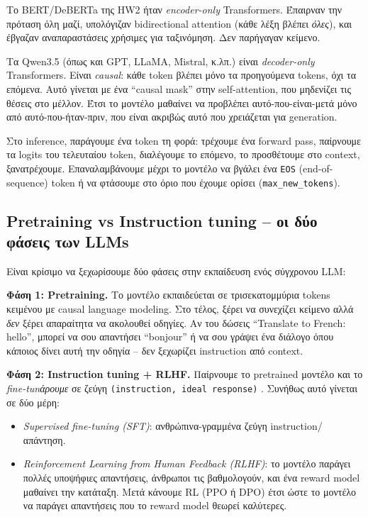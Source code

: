 \documentclass[12pt]{fphw}
\begin{document}
Το BERT/DeBERTa της HW2 ήταν \emph{encoder-only} Transformers. Έπαιρναν την πρόταση όλη μαζί, υπολόγιζαν bidirectional attention (κάθε λέξη βλέπει \emph{όλες}), και έβγαζαν αναπαραστάσεις χρήσιμες για ταξινόμηση. Δεν παρήγαγαν κείμενο.

Τα Qwen3.5 (όπως και GPT, LLaMA, Mistral, κ.λπ.) είναι \emph{decoder-only} Transformers. Είναι \emph{causal}: κάθε token βλέπει μόνο τα προηγούμενα tokens, όχι τα επόμενα. Αυτό γίνεται με ένα ``causal mask'' στην self-attention, που μηδενίζει τις θέσεις στο μέλλον. Έτσι το μοντέλο μαθαίνει να προβλέπει αυτό-που-είναι-μετά μόνο από αυτό-που-ήταν-πριν, που είναι ακριβώς αυτό που χρειάζεται για generation.

Στο inference, παράγουμε ένα token τη φορά: τρέχουμε ένα forward pass, παίρνουμε τα logits του τελευταίου token, διαλέγουμε το επόμενο, το προσθέτουμε στο context, ξανατρέχουμε. Επαναλαμβάνουμε μέχρι το μοντέλο να βγάλει ένα \texttt{EOS} (end-of-sequence) token ή να φτάσουμε στο όριο που έχουμε ορίσει (\texttt{max\_new\_tokens}).

\subsection{Pretraining vs Instruction tuning -- οι δύο φάσεις των LLMs}

Είναι κρίσιμο να ξεχωρίσουμε δύο φάσεις στην εκπαίδευση ενός σύγχρονου LLM:

\textbf{Φάση 1: Pretraining.} Το μοντέλο εκπαιδεύεται σε τρισεκατομμύρια tokens κειμένου με causal language modeling. Στο τέλος, ξέρει να συνεχίζει κείμενο αλλά \emph{δεν} ξέρει απαραίτητα να ακολουθεί οδηγίες. Αν του δώσεις ``Translate to French: hello'', μπορεί να σου απαντήσει ``bonjour'' ή να σου γράψει ένα διάλογο όπου κάποιος δίνει αυτή την οδηγία -- δεν ξεχωρίζει instruction από context.

\textbf{Φάση 2: Instruction tuning + RLHF.} Παίρνουμε το pretrained μοντέλο και το \emph{fine-tunάρουμε} σε ζεύγη \texttt{(instruction, ideal response)} \cite{wei2022instructiontuned,ouyang2022instructgpt}. Συνήθως αυτό γίνεται σε δύο μέρη:

\begin{itemize}
    \item \emph{Supervised fine-tuning (SFT)}: ανθρώπινα-γραμμένα ζεύγη instruction/απάντηση.
    \item \emph{Reinforcement Learning from Human Feedback (RLHF)}: το μοντέλο παράγει πολλές υποψήφιες απαντήσεις, άνθρωποι τις βαθμολογούν, και ένα reward model μαθαίνει την κατάταξη. Μετά κάνουμε RL (PPO ή DPO) έτσι ώστε το μοντέλο να παράγει απαντήσεις που το reward model θεωρεί καλύτερες.
\end{itemize}
\end{document}
